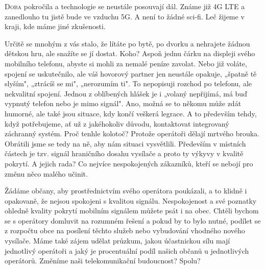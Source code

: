 \documentclass{article}
\begin{document}
\begin{multicols}{2}{

\lettrine{D}{oba} pokročila a technologie se neustále posouvají dál. Známe již 4G LTE  a zanedlouho tu jistě bude ve vzduchu 5G. A není to žádné sci-fi. Leč žijeme v kraji, kde máme jiné zkušenosti.

Určitě se mnohým z vás stalo, že lítáte po bytě, po dvorku a nehrajete žádnou dětskou hru, ale snažíte se jí dostat. Koho? Aspoň jednu čárku na displeji svého mobilního telefonu, abyste si mohli za nemalé peníze zavolat. Nebo již voláte, spojení se uskutečnilo, ale váš hovorový partner jen neustále opakuje, „špatně tě slyším", „ztrácíš se mi", „nerozumím ti". To nepopisuji rozchod po telefonu, ale nekvalitní spojení. Jednou z oblíbených hlášek je i „volaný nepřijímá, má buď vypnutý telefon nebo je mimo signál". Ano, možná se to někomu může zdát humorné, ale také jsou situace, kdy končí veškerá legrace. A to především tehdy, když potřebujeme, ať už z jakéhokoliv důvodu, kontaktovat integrovaný záchranný systém. Proč tenhle kolotoč? Protože operátoři dělají mrtvého brouka. Obrátili jsme se tedy na ně, aby nám situaci vysvětlili. Především v místních částech je tzv. signál hraničního dosahu vysílače a proto ty výkyvy v kvalitě pokrytí. A jejich rada? Co nejvíce nespokojených zákazníků, kteří se nebojí pro změnu něco malého učinit. 

Žádáme občany, aby prostřednictvím svého operátora poukázali, a to klidně i opakovaně, že nejsou spokojeni s kvalitou signálu. Nespokojenost a své poznatky ohledně kvality pokrytí mobilním signálem můžete psát i na obec. Chtěli bychom se s operátory domluvit na rozumném řešení a pokud by to bylo nutné, podílet se z rozpočtu obce na posílení těchto služeb nebo vybudování vhodného nového vysílače. Máme také zájem udělat průzkum, jakou účastnickou sílu mají jednotlivý operátoři a jaký je procentuální podíl našich občanů u jednotlivých operátorů. Změníme naši telekomunikační budoucnost? Spolu?
}\end{multicols}
\closearticle
\end{document}
